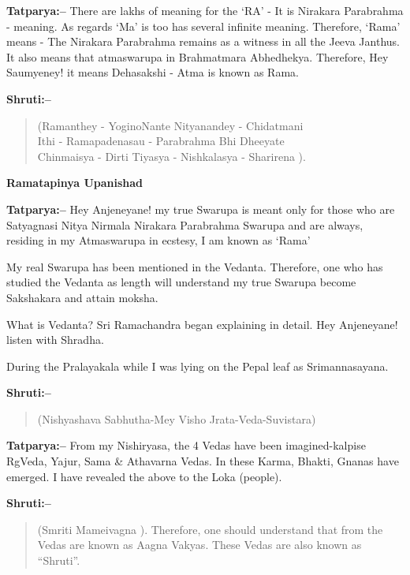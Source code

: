 \textbf{Tatparya:–} There are lakhs of meaning for the ‘RA’ - It is Nirakara Parabrahma - meaning. As regards ‘Ma’ is too has several infinite meaning. Therefore, ‘Rama’ means - The Nirakara Parabrahma remains as a witness in all the Jeeva Janthus. It also means that atmaswarupa in Brahmatmara Abhedhekya. Therefore, Hey Saumyeney! it means Dehasakshi - Atma is known as Rama.

\textbf{Shruti:–}

\begin{verse}
(Ramanthey - YoginoNante Nityanandey - Chidatmani \\ Ithi - Ramapadenasau - Parabrahma Bhi Dheeyate \\ Chinmaisya - Dirti Tiyasya - Nishkalasya - Sharirena ).
\end{verse}

\begin{flushright}
\textbf{Ramatapinya Upanishad}
\end{flushright}

\textbf{Tatparya:–} Hey Anjeneyane! my true Swarupa is meant only for those who are Satyagnasi Nitya Nirmala Nirakara Parabrahma Swarupa and are always, residing in my Atmaswarupa in ecstesy, I am known as ‘Rama’

My real Swarupa has been mentioned in the Vedanta. Therefore, one who has studied the Vedanta as length will understand my true Swarupa become Sakshakara and attain moksha.

What is Vedanta? Sri Ramachandra began explaining in detail. Hey Anjeneyane! listen with Shradha.

During the Pralayakala while I was lying on the Pepal leaf as Srimannasayana.

\textbf{Shruti:–}

\begin{verse}
(Nishyashava Sabhutha-Mey Visho Jrata-Veda-Suvistara)
\end{verse}

\textbf{Tatparya:–} From my Nishiryasa, the 4 Vedas have been imagined-kalpise RgVeda, Yajur, Sama \& Athavarna Vedas. In these Karma, Bhakti, Gnanas have emerged. I have revealed the above to the Loka (people).

\textbf{Shruti:–}

\begin{verse}
(Smriti Mameivagna ). Therefore, one should understand that from the Vedas are known as Aagna Vakyas. These Vedas are also known as “Shruti”.
\end{verse}

